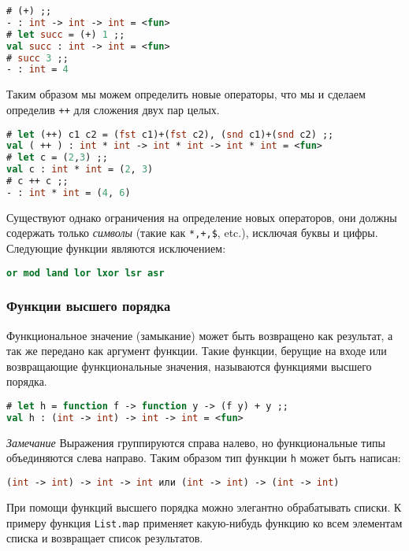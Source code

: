 \begin{lstlisting}[language=OCaml]
# (+) ;;
- : int -> int -> int = <fun>
# let succ = (+) 1 ;;
val succ : int -> int = <fun>
# succ 3 ;;
- : int = 4
\end{lstlisting}

Таким образом мы можем определить новые операторы, что мы и сделаем определив
\texttt{++} для сложения двух пар целых.

\begin{lstlisting}[language=OCaml]
# let (++) c1 c2 = (fst c1)+(fst c2), (snd c1)+(snd c2) ;;
val ( ++ ) : int * int -> int * int -> int * int = <fun>
# let c = (2,3) ;;
val c : int * int = (2, 3)
# c ++ c ;;
- : int * int = (4, 6)
\end{lstlisting}

Существуют однако ограничения на определение новых операторов, они должны
содержать только {\it символы} (такие как \texttt{*,+,\$}, etc.), исключая буквы
и цифры. Следующие функции являются исключением:

\begin{lstlisting}[language=OCaml]
or mod land lor lxor lsr asr
\end{lstlisting}

\subsubsection{Функции высшего порядка}

Функциональное значение (замыкание) может быть возвращено как результат, а так
же передано как аргумент функции. Такие функции, берущие на входе или
возвращающие функциональные значения, называются функциями высшего порядка.

\begin{lstlisting}[language=OCaml]
# let h = function f -> function y -> (f y) + y ;;
val h : (int -> int) -> int -> int = <fun>
\end{lstlisting}

{\it Замечание}
Выражения группируются справа налево, но функциональные типы объединяются слева
направо. Таким образом тип функции \texttt{h} может быть написан:

\begin{lstlisting}[language=OCaml]
(int -> int) -> int -> int или (int -> int) -> (int -> int)
\end{lstlisting}

При помощи функций высшего порядка можно элегантно обрабатывать списки. К
примеру функция \texttt{List.map} применяет какую-нибудь функцию ко всем
элементам списка и возвращает список результатов.

